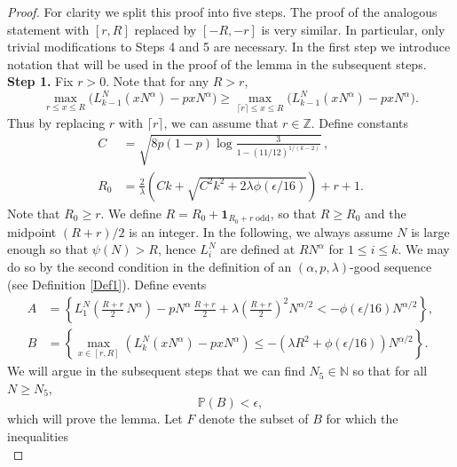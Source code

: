 	\begin{proof}
		
		For clarity we split this proof into five steps. The proof of the analogous statement with $[r,R]$ replaced by $[-R,-r]$ is very similar. In particular, only trivial modifications to Steps 4 and 5 are necessary. In the first step we introduce notation that will be used in the proof of the lemma in the subsequent steps.\\
		
		\noindent\textbf{Step 1.} Fix $r>0$. Note that for any $R>r$,
		\[
		\max_{r\leq x\leq R} \big(L_{k-1}^N(xN^\alpha) - pxN^\alpha\big) \geq \max_{\lceil r\rceil \leq x \leq R} \big(L_{k-1}^N(xN^\alpha) - pxN^\alpha\big).
		\]
		Thus by replacing $r$ with $\lceil r\rceil$, we can assume that $r\in\mathbb{Z}$. Define constants
		\begin{align}
		C &= \sqrt{ 8p(1-p) \log\frac{3}{1-(11/12)^{1/(k-2)}}}\,,\label{21Cdef}\\
		R_0 &= \frac{2}{\lambda}\left(Ck+\sqrt{C^{2}k^{2}+2\lambda\phi(\epsilon/16)}\right) + r + 1. \label{21Rdef}
		\end{align}
		Note that $R_0\geq r$. We define $R = R_0 + \mathbf{1}_{R_0 + r\;\mathrm{odd}}$, so that $R\geq R_0$ and the midpoint $(R+r)/2$ is an integer. In the following, we always assume $N$ is large enough so that $\psi(N) > R$, hence $L_i^N$ are defined at $RN^\alpha$ for $1\leq i\leq k$. We may do so by the second condition in the definition of an $(\alpha,p,\lambda)$-good sequence (see Definition \ref{Def1}). Define events
		\begin{equation}\label{21AB}
		\begin{split}
		A &= \left\{L_1^N\left(\frac{R+r}{2}\,N^\alpha\right) - pN^\alpha\,\frac{R+r}{2} + \lambda\left(\frac{R+r}{2}\right)^2 N^{\alpha/2} < -\phi(\epsilon/16)N^{\alpha/2}\right\},\\
		B &= \left\{\max_{x\in[r,R]} \left(L_k^N(xN^\alpha) - pxN^\alpha\right) \leq -(\lambda R^2 + \phi(\epsilon/16)) N^{\alpha/2} \right\}.
		\end{split}
		\end{equation}
		We will argue in the subsequent steps that we can find $N_5\in\mathbb{N}$ so that for all $N\geq N_5$,
		\begin{equation}\label{21Bbound}
		\mathbb{P}(B) < \epsilon,
		\end{equation}
		which will prove the lemma. Let $F$ denote the subset of $B$ for which the inequalities
		\begin{equation}\label{21x1y1}

\end{equation}
\end{proof}
